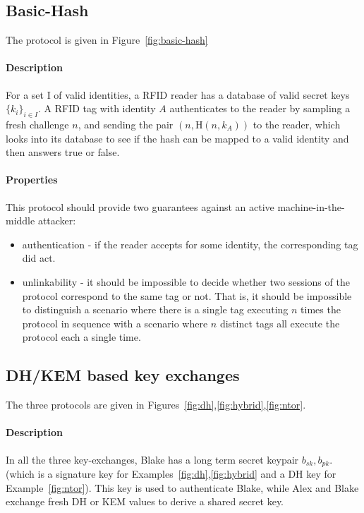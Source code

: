 \documentclass{article}
\newcommand{\sfsk}{\mathit{sk}}
\newcommand{\sfpk}{\mathit{pk}}
\newcommand{\kwf}[1]{\mathrm{#1}}
\newcommand{\hash}{\kwf{H}}
\begin{document}
\subsection{Basic-Hash}

The protocol is given in Figure~\ref{fig:basic-hash}

\paragraph{Description} For a set I of valid identities, a RFID reader has a database of valid secret keys $\{k_i\}_{i \in I}$. A RFID tag with identity $A$ authenticates to the reader by sampling a fresh challenge $n$,
and sending the pair $(n,\hash(n,k_A))$ to the reader, which looks into its database to see if the hash can be mapped to a valid identity and then answers true or false.


\paragraph{Properties} This protocol should provide two guarantees against an active machine-in-the-middle attacker:
\begin{itemize}
\item authentication - if the reader accepts for some identity, the corresponding tag did act.
\item unlinkability - it should be impossible to decide whether two sessions of the protocol correspond to the same tag or not. That is, it should be impossible to distinguish a scenario where there is a single tag executing $n$ times the protocol in sequence with a scenario where $n$ distinct tags all execute the protocol each a single time. 
\end{itemize}


\subsection{DH/KEM based key exchanges}

The three protocols are given in Figures~\ref{fig:dh},\ref{fig:hybrid},\ref{fig:ntor}.

 \paragraph{Description}In all the three key-exchanges, Blake has a long term secret keypair $b_\sfsk,b_\sfpk$. (which is a signature key for Examples~\ref{fig:dh},\ref{fig:hybrid} and a DH key for Example~\ref{fig:ntor}).
This key is used to authenticate Blake, while Alex and Blake exchange fresh DH or KEM values to derive a shared secret key.
\end{document}
